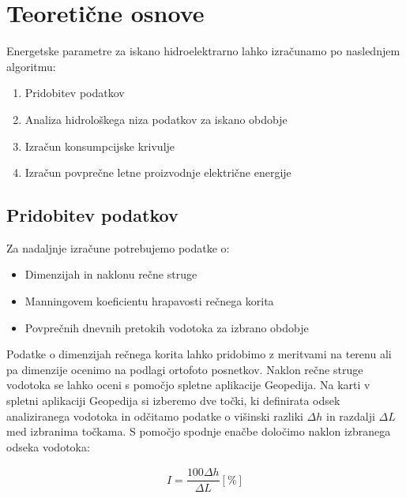 \chapter{Teoretične osnove}

Energetske parametre za iskano hidroelektrarno lahko izračunamo po naslednjem algoritmu:
\begin{enumerate}[noitemsep, topsep=0pt]
	\item Pridobitev podatkov
	\item Analiza hidrološkega niza podatkov za iskano obdobje
	\item Izračun konsumpcijske krivulje
	\item Izračun povprečne letne proizvodnje električne energije
\end{enumerate}


\section{Pridobitev podatkov} \label{sec:teorija_pridobitevPodatkov}
Za nadaljnje izračune potrebujemo podatke o:
\begin{itemize}[noitemsep, topsep=0pt]
	\item Dimenzijah in naklonu rečne struge
	\item Manningovem koeficientu hrapavosti rečnega korita
	\item Povprečnih dnevnih pretokih vodotoka za izbrano obdobje
\end{itemize}

Podatke o dimenzijah rečnega korita lahko pridobimo z meritvami na terenu ali pa dimenzije ocenimo na podlagi ortofoto posnetkov. Naklon rečne struge vodotoka se lahko oceni s pomočjo spletne aplikacije Geopedija. Na karti v spletni aplikaciji Geopedija si izberemo dve točki, ki definirata odsek analiziranega vodotoka in odčitamo podatke o višinski razliki $\Delta h$ in razdalji $\Delta L$ med izbranima točkama. S pomočjo spodnje enačbe določimo naklon izbranega odseka vodotoka:

\begin{ceqn}
\begin{align}
 I = \dfrac{100\Delta h}{\Delta L} [\%]
\end{align}
\end{ceqn}


